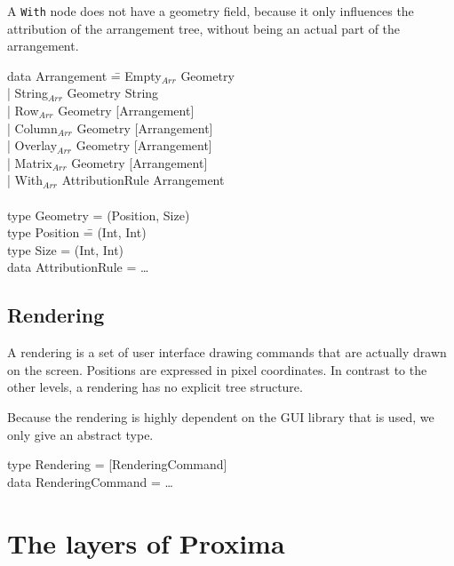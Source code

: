 A \verb|With| node does not have a geometry field, because it only influences the attribution of the arrangement tree, without being an actual part of the arrangement. 
\ttfamily
\begin{tabbing}
data Arrangement \= = Empty$_{Arr}$ Geometry\\
                 \> | String$_{Arr}$ Geometry String\\
                 \> | Row$_{Arr}$ Geometry [Arrangement]\\
                 \> | Column$_{Arr}$ Geometry [Arrangement]\\
                 \> | Overlay$_{Arr}$ Geometry [Arrangement]\\
                 \> | Matrix$_{Arr}$ Geometry [Arrangement]\\
                 \> | With$_{Arr}$ AttributionRule Arrangement\\
\\
type Geometry = (Position, Size)\\
type Position \= = (Int, Int)\\
type Size      \> = (Int, Int)\\
data AttributionRule = \dots\\
\end{tabbing}
\rmfamily

%																
\subsection{Rendering}

A rendering is a set of user interface drawing commands that are actually drawn on the screen. Positions are expressed in pixel coordinates. In contrast to the other levels, a rendering has no explicit tree structure.

Because the rendering is highly dependent on the GUI library that is used, we only give an abstract type.

\noindent
\ttfamily
\begin{tabbing}
type Rendering = [RenderingCommand]\\
data RenderingCommand = \dots
\end{tabbing}
\rmfamily


%																
%																
%																
\section{The layers of Proxima}

